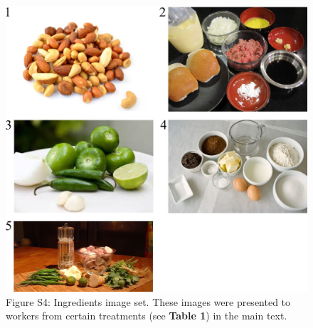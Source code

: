 \documentclass[letterpaper]{article}
\begin{document}
\begin{figure}
	\includegraphics[scale=1.00]{figs/taskImages/ingredients.jpg}
	\caption*{Figure S4: Ingredients image set. These images were presented to workers 
		from certain treatments (see \textbf{Table 1}) in the main text.}
\end{figure}
\end{document}
